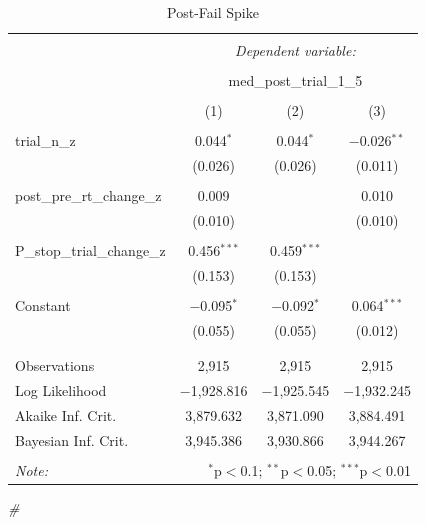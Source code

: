 \documentclass[
]{article}
\newenvironment{Shaded}{\begin{snugshade}}{\end{snugshade}}
\newcommand{\CommentTok}[1]{\textcolor[rgb]{0.56,0.35,0.01}{\textit{#1}}}
\begin{document}
\begin{table}[!htbp] \centering 
  \caption{Post-Fail Spike} 
  \label{} 
\begin{tabular}{@{\extracolsep{5pt}}lccc} 
\\[-1.8ex]\hline 
\hline \\[-1.8ex] 
 & \multicolumn{3}{c}{\textit{Dependent variable:}} \\ 
\cline{2-4} 
\\[-1.8ex] & \multicolumn{3}{c}{med\_post\_trial\_1\_5} \\ 
\\[-1.8ex] & (1) & (2) & (3)\\ 
\hline \\[-1.8ex] 
 trial\_n\_z & 0.044$^{*}$ & 0.044$^{*}$ & $-$0.026$^{**}$ \\ 
  & (0.026) & (0.026) & (0.011) \\ 
  & & & \\ 
 post\_pre\_rt\_change\_z & 0.009 &  & 0.010 \\ 
  & (0.010) &  & (0.010) \\ 
  & & & \\ 
 P\_stop\_trial\_change\_z & 0.456$^{***}$ & 0.459$^{***}$ &  \\ 
  & (0.153) & (0.153) &  \\ 
  & & & \\ 
 Constant & $-$0.095$^{*}$ & $-$0.092$^{*}$ & 0.064$^{***}$ \\ 
  & (0.055) & (0.055) & (0.012) \\ 
  & & & \\ 
\hline \\[-1.8ex] 
Observations & 2,915 & 2,915 & 2,915 \\ 
Log Likelihood & $-$1,928.816 & $-$1,925.545 & $-$1,932.245 \\ 
Akaike Inf. Crit. & 3,879.632 & 3,871.090 & 3,884.491 \\ 
Bayesian Inf. Crit. & 3,945.386 & 3,930.866 & 3,944.267 \\ 
\hline 
\hline \\[-1.8ex] 
\textit{Note:}  & \multicolumn{3}{r}{$^{*}$p$<$0.1; $^{**}$p$<$0.05; $^{***}$p$<$0.01} \\ 
\end{tabular} 
\end{table}

\begin{Shaded}
\begin{Highlighting}[]
\CommentTok{# }
\end{Highlighting}
\end{Shaded}
\end{document}
